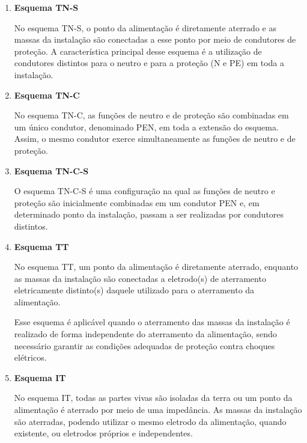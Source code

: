 \documentclass[12pt,openright,oneside,a4paper,brazil]{abntex2}
\begin{document}
\begin{enumerate}[label=\alph*)]

    \item \textbf{Esquema TN-S}
    
    \hspace{1.27cm} No esquema TN-S, o ponto da alimentação é diretamente aterrado e as massas da instalação são conectadas a esse ponto por meio de condutores de proteção. A característica principal desse esquema é a utilização de condutores distintos para o neutro e para a proteção (N e PE) em toda a instalação.

    \item \textbf{Esquema TN-C}

    \hspace{1.27cm} No esquema TN-C, as funções de neutro e de proteção são combinadas em um único condutor, denominado PEN, em toda a extensão do esquema. Assim, o mesmo condutor exerce simultaneamente as funções de neutro e de proteção.

    \item \textbf{Esquema TN-C-S}

    \hspace{1.27cm} O esquema TN-C-S é uma configuração na qual as funções de neutro e proteção são inicialmente combinadas em um condutor PEN e, em determinado ponto da instalação, passam a ser realizadas por condutores distintos.

    \item \textbf{Esquema TT}

    \hspace{1.27cm} No esquema TT, um ponto da alimentação é diretamente aterrado, enquanto as massas da instalação são conectadas a eletrodo(s) de aterramento eletricamente distinto(s) daquele utilizado para o aterramento da alimentação.

    \hspace{1.27cm}Esse esquema é aplicável quando o aterramento das massas da instalação é realizado de forma independente do aterramento da alimentação, sendo necessário garantir as condições adequadas de proteção contra choques elétricos.


    \item \textbf{Esquema IT}

    \hspace{1.27cm}No esquema IT, todas as partes vivas são isoladas da terra ou um ponto da alimentação é aterrado por meio de uma impedância. As massas da instalação são aterradas, podendo utilizar o mesmo eletrodo da alimentação, quando existente, ou eletrodos próprios e independentes.

\end{enumerate}
\end{document}
